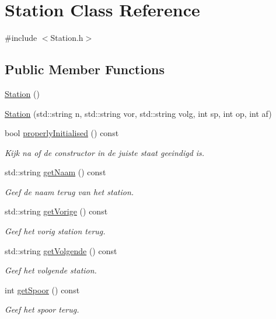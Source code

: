 \hypertarget{class_station}{}\section{Station Class Reference}
\label{class_station}


{\ttfamily \#include $<$Station.\+h$>$}

\subsection*{Public Member Functions}
\begin{DoxyCompactItemize}
\item 
\hyperlink{class_station_a73d335726aad1d844d81cda6d9fd74e6}{Station} ()
\item 
\hyperlink{class_station_a41fd39388109ad33ea86eb9831ab2f45}{Station} (std\+::string n, std\+::string vor, std\+::string volg, int sp, int op, int af)
\item 
bool \hyperlink{class_station_a5749af84d13b71d34aa1fb5b0a935a20}{properly\+Initialised} () const 
\begin{DoxyCompactList}\small\item\em Kijk na of de constructor in de juiste staat geeindigd is. \end{DoxyCompactList}\item 
std\+::string \hyperlink{class_station_a6d4234bcd1027dc83c7984e207e8bd74}{get\+Naam} () const 
\begin{DoxyCompactList}\small\item\em Geef de naam terug van het station. \end{DoxyCompactList}\item 
std\+::string \hyperlink{class_station_af7516368cf83e9cbadf10309bc8c4aa2}{get\+Vorige} () const 
\begin{DoxyCompactList}\small\item\em Geef het vorig station terug. \end{DoxyCompactList}\item 
std\+::string \hyperlink{class_station_a6db00c0be0f1c6aea3848038a2a9a350}{get\+Volgende} () const 
\begin{DoxyCompactList}\small\item\em Geef het volgende station. \end{DoxyCompactList}\item 
int \hyperlink{class_station_a0fc1a72d194b9f67151eea0e957aad3c}{get\+Spoor} () const 
\begin{DoxyCompactList}\small\item\em Geef het spoor terug. \end{DoxyCompactList}\item 

\end{DoxyCompactItemize}
